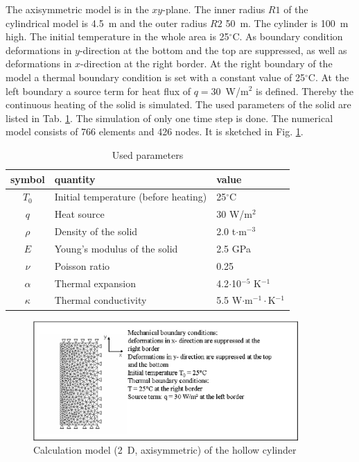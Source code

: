 The axisymmetric model is in the $xy$-plane. The inner radius $R1$ of the cylindrical model is 4.5~m and the outer radius $R2$ 50~m. The cylinder is 100~m high. The initial temperature in the whole area is 25$^{\circ}$C. As boundary condition deformations in $y$-direction at the bottom and the top are suppressed, as well as deformations in $x$-direction at the right border. At the right boundary of the model a thermal boundary condition is set with a constant value of 25$^{\circ}$C. At the left boundary a source term for heat flux of $q=30$~W/m$^2$ is defined. Thereby the continuous heating of the solid is simulated. The used parameters of the solid are listed in Tab. \ref{tab63}. The simulation of only one time step is done. The numerical model consists of 766 elements and 426 nodes. It is sketched in Fig. \ref{fig69}.
\begin{table}[htbp]
\centering
\begin{tabular}{|c|l|l|}
\hline
symbol & quantity & value \\
\hline
$T_0$  & Initial temperature (before heating) & 25$^{\circ}$C \\
\hline
$q$  & Heat source & 30 W/m$^2$ \\
\hline
$\rho$  & Density of the solid &  2.0 t$\cdot$m$^{-3}$  \\			
\hline
$E$ & Young's modulus of the solid & 2.5 GPa \\
\hline
$\nu$ & Poisson ratio & 0.25 \\
\hline
$\alpha$ & Thermal expansion & 4.2$\cdot$10$^{-5}$ K$^{-1}$ \\
\hline
$\kappa$ & Thermal conductivity & 5.5 W$\cdot$m$^{-1}\cdot$K$^{-1}$ \\
\hline
\end{tabular}
\caption{Used parameters}
\label{tab63}
\end{table}

\begin{figure}[htbp]
\centering
\includegraphics[width=0.9\textwidth]{TM/figures/fig69.eps}
\caption{Calculation model (2~D, axisymmetric) of the hollow cylinder}
\label{fig69}
\end{figure}

